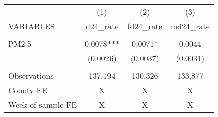 \begin{tabular}{lccc} \hline
 & (1) & (2) & (3) \\
VARIABLES & d24\_rate & fd24\_rate & md24\_rate \\ \hline
 &  &  &  \\
PM2.5 & 0.0078*** & 0.0071* & 0.0044 \\
 & (0.0026) & (0.0037) & (0.0031) \\
 &  &  &  \\
Observations & 137,194 & 130,326 & 133,877 \\
County FE & X & X & X \\
 Week-of-sample FE & X & X & X \\ \hline
\end{tabular}
